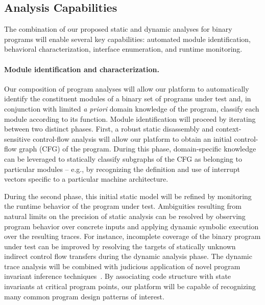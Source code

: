 \documentclass[letterpaper,twoside,11pt,headings=small]{scrartcl}
\begin{document}
\subsection{Analysis Capabilities}
\label{sec:research:structure:modules}

The combination of our proposed static and dynamic analyses for binary
programs will enable several key capabilities: automated module
identification, behavioral characterization, interface enumeration, and
runtime monitoring.

\paragraph{Module identification and characterization.} Our composition of
program analyses will allow our platform to automatically identify the
constituent modules of a binary set of programs under test and, in conjunction
with limited \emph{a priori} domain knowledge of the program, classify each
module according to its function.  Module identification will proceed by
iterating between two distinct phases. First, a robust static disassembly and
context-sensitive control-flow analysis will allow our platform to obtain an
initial control-flow graph (CFG) of the program. During this phase,
domain-specific knowledge can be leveraged to statically classify subgraphs of
the CFG as belonging to particular modules -- e.g., by recognizing the
definition and use of interrupt vectors specific to a particular machine
architecture.

During the second phase, this initial static model will be refined by
monitoring the runtime behavior of the program under test.  Ambiguities
resulting from natural limits on the precision of static analysis can be
resolved by observing program behavior over concrete inputs and applying
dynamic symbolic execution over the resulting traces.  For instance,
incomplete coverage of the binary program under test can be improved by
resolving the targets of statically unknown indirect control flow transfers
during the dynamic analysis phase.  The dynamic trace analysis will be
combined with judicious application of novel program invariant inference
techniques~\cite{ernst:2009:daikon,csallner:icse2008:dysy,krka:icsa2010:inference}.
By associating code structure with state invariants at critical program
points, our platform will be capable of recognizing many common program design
patterns of interest.
\end{document}
